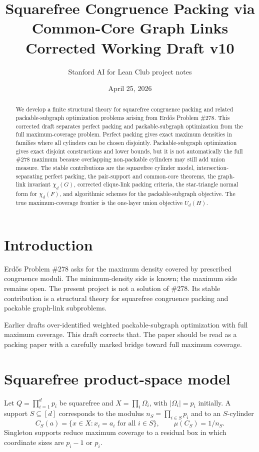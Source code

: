 \documentclass[11pt]{article}
\title{Squarefree Congruence Packing via Common-Core Graph Links\\Corrected Working Draft v10}
\author{Stanford AI for Lean Club project notes}
\date{April 25, 2026}
\begin{document}
\maketitle
\begin{abstract}
We develop a finite structural theory for squarefree congruence packing and related packable-subgraph optimization problems arising from Erd\H{o}s Problem \#278. This corrected draft separates perfect packing and packable-subgraph optimization from the full maximum-coverage problem. Perfect packing gives exact maximum densities in families where all cylinders can be chosen disjointly. Packable-subgraph optimization gives exact disjoint constructions and lower bounds, but it is not automatically the full \#278 maximum because overlapping non-packable cylinders may still add union measure. The stable contributions are the squarefree cylinder model, intersection-separating perfect packing, the pair-support and common-core theorems, the graph-link invariant $\chi_d(G)$, corrected clique-link packing criteria, the star-triangle normal form for $\chi_d(F)$, and algorithmic schemes for the packable-subgraph objective. The true maximum-coverage frontier is the one-layer union objective $U_d(H)$.
\end{abstract}

\section{Introduction}
Erd\H{o}s Problem \#278 asks for the maximum density covered by prescribed congruence moduli. The minimum-density side is known; the maximum side remains open. The present project is not a solution of \#278. Its stable contribution is a structural theory for squarefree congruence packing and packable graph-link subproblems.

Earlier drafts over-identified weighted packable-subgraph optimization with full maximum coverage. This draft corrects that. The paper should be read as a packing paper with a carefully marked bridge toward full maximum coverage.

\section{Squarefree product-space model}
Let $Q=\prod_{i=1}^d p_i$ be squarefree and $X=\prod_i\Omega_i$, with $|\Omega_i|=p_i$ initially. A support $S\subseteq[d]$ corresponds to the modulus $n_S=\prod_{i\in S}p_i$ and to an $S$-cylinder
\[
C_S(a)=\{x\in X:x_i=a_i\text{ for all }i\in S\},
\qquad \mu(C_S)=1/n_S.
\]
Singleton supports reduce maximum coverage to a residual box in which coordinate sizes are $p_i-1$ or $p_i$.
\end{document}
